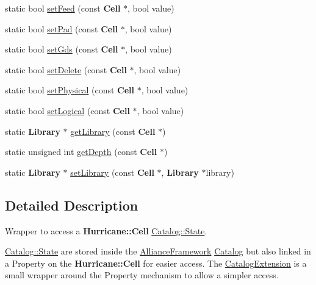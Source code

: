 \begin{DoxyCompactItemize}
\item 
static bool \hyperlink{classCRL_1_1CatalogExtension_ab82e4b139ca636feaca5d97836891b68}{set\+Feed} (const \textbf{ Cell} $\ast$, bool value)
\item 
static bool \hyperlink{classCRL_1_1CatalogExtension_afceda0d184ed2964e160b563a216bc35}{set\+Pad} (const \textbf{ Cell} $\ast$, bool value)
\item 
static bool \hyperlink{classCRL_1_1CatalogExtension_a6c440bfd5ac56c9e07213c1347f0610a}{set\+Gds} (const \textbf{ Cell} $\ast$, bool value)
\item 
static bool \hyperlink{classCRL_1_1CatalogExtension_a8a5bdbfb8c898f8ea00c8718c6714983}{set\+Delete} (const \textbf{ Cell} $\ast$, bool value)
\item 
static bool \hyperlink{classCRL_1_1CatalogExtension_ae3de9795e0ddce5a767cf53d79fec077}{set\+Physical} (const \textbf{ Cell} $\ast$, bool value)
\item 
static bool \hyperlink{classCRL_1_1CatalogExtension_a9609c756887f433fe9b250e32ff1ae0a}{set\+Logical} (const \textbf{ Cell} $\ast$, bool value)
\item 
static \textbf{ Library} $\ast$ \hyperlink{classCRL_1_1CatalogExtension_a6681f9fbe64998a27fe532fd3591afc7}{get\+Library} (const \textbf{ Cell} $\ast$)
\item 
static unsigned int \hyperlink{classCRL_1_1CatalogExtension_ae4f8d30cf08796b62422546c05526d86}{get\+Depth} (const \textbf{ Cell} $\ast$)
\item 
static \textbf{ Library} $\ast$ \hyperlink{classCRL_1_1CatalogExtension_a6ef1b96f9bbbe39e13a5aba073f2394c}{set\+Library} (const \textbf{ Cell} $\ast$, \textbf{ Library} $\ast$library)
\end{DoxyCompactItemize}


\subsection{Detailed Description}
Wrapper to access a \textbf{ Hurricane\+::\+Cell} \hyperlink{classCRL_1_1Catalog_1_1State}{Catalog\+::\+State}. 

\hyperlink{classCRL_1_1Catalog_1_1State}{Catalog\+::\+State} are stored inside the \hyperlink{classCRL_1_1AllianceFramework}{Alliance\+Framework} \hyperlink{classCRL_1_1Catalog}{Catalog} but also linked in a Property on the \textbf{ Hurricane\+::\+Cell} for easier access. The \hyperlink{classCRL_1_1CatalogExtension}{Catalog\+Extension} is a small wrapper around the Property mechanism to allow a simpler access. 

